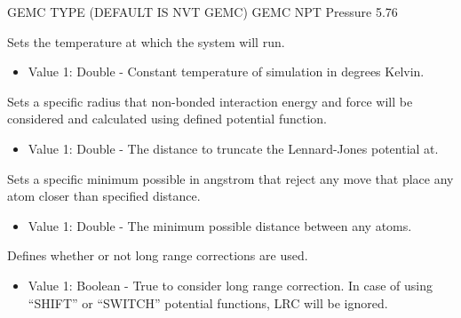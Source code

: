 \documentclass[letterpaper,10pt,english]{sphinxmanual}
\begin{document}
\begin{description}
\begin{itemize}
\end{itemize}

%
\begin{sphinxVerbatim}[commandchars=\\\{\}]
\PYGZsh{}\PYGZsh{}\PYGZsh{}\PYGZsh{}\PYGZsh{}\PYGZsh{}\PYGZsh{}\PYGZsh{}\PYGZsh{}\PYGZsh{}\PYGZsh{}\PYGZsh{}\PYGZsh{}\PYGZsh{}\PYGZsh{}\PYGZsh{}\PYGZsh{}\PYGZsh{}\PYGZsh{}\PYGZsh{}\PYGZsh{}\PYGZsh{}\PYGZsh{}\PYGZsh{}\PYGZsh{}\PYGZsh{}\PYGZsh{}\PYGZsh{}\PYGZsh{}\PYGZsh{}\PYGZsh{}\PYGZsh{}\PYGZsh{}
\PYGZsh{} GEMC TYPE (DEFAULT IS NVT GEMC)
\PYGZsh{}\PYGZsh{}\PYGZsh{}\PYGZsh{}\PYGZsh{}\PYGZsh{}\PYGZsh{}\PYGZsh{}\PYGZsh{}\PYGZsh{}\PYGZsh{}\PYGZsh{}\PYGZsh{}\PYGZsh{}\PYGZsh{}\PYGZsh{}\PYGZsh{}\PYGZsh{}\PYGZsh{}\PYGZsh{}\PYGZsh{}\PYGZsh{}\PYGZsh{}\PYGZsh{}\PYGZsh{}\PYGZsh{}\PYGZsh{}\PYGZsh{}\PYGZsh{}\PYGZsh{}\PYGZsh{}\PYGZsh{}\PYGZsh{}
GEMC NPT
Pressure 5.76
\end{sphinxVerbatim}

\item[{\sphinxcode{\sphinxupquote{Temperature}}}] \leavevmode
Sets the temperature at which the system will run.
\begin{itemize}
\item {} 
Value 1: Double - Constant temperature of simulation in degrees Kelvin.

\end{itemize}

\item[{\sphinxcode{\sphinxupquote{Rcut}}}] \leavevmode
Sets a specific radius that non-bonded interaction energy and force will be considered and calculated using defined potential function.
\begin{itemize}
\item {} 
Value 1: Double - The distance to truncate the Lennard-Jones potential at.

\end{itemize}

\item[{\sphinxcode{\sphinxupquote{RcutLow}}}] \leavevmode
Sets a specific minimum possible in angstrom that reject any move that place any atom closer than specified distance.
\begin{itemize}
\item {} 
Value 1: Double - The minimum possible distance between any atoms.

\end{itemize}

\item[{\sphinxcode{\sphinxupquote{LRC}}}] \leavevmode
Defines whether or not long range corrections are used.
\begin{itemize}
\item {} 
Value 1: Boolean - True to consider long range correction. In case of using “SHIFT” or “SWITCH” potential functions, LRC will be ignored.


\end{itemize}
\end{description}
\end{document}
